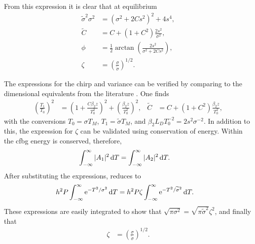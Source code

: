 From this expression it is clear that at equilibrium
\begin{subequations}
\begin{align}
\label{eq:varout}
\widetilde{\sigma}^2 \sigma^2 &= \left( \sigma^2 + 2 C s^2 \right)^2 + 4s^4, \\
\label{eq:chirpout}
\widetilde{C} &= C + (1+C^2) \frac{2 s^2}{\sigma^2}, \\
\label{eq:phase}
\phi &= \frac{1}{2} \arctan \left( \frac{2s^2}{\sigma^2 + 2C s^2} \right), \\
\zeta &= \left( \frac{\sigma}{\widetilde{\sigma}} \right)^{1/2}.
\end{align}
\end{subequations}

The expressions for the chirp and variance can be verified by comparing to the dimensional equivalents from the literature \cite{agrawal2013, anderson, ferreira, silfvast}. One finds
\begin{align*}
\left( \frac{T_1}{T_0} \right)^2 &= \left( 1 + \frac{C \beta_2 z}{T_0^2} \right)^2 + \left( \frac{ \beta_2 z}{T_0^2} \right)^2,&
\widetilde{C} &= C + (1+C^2) \frac{\beta_2 z}{T_0^2},
\end{align*}
with the conversions $T_0 = \sigma T_M$, $T_1 = \widetilde{\sigma} T_M$, and $\beta_2 L_D T_0^{-2} = 2s^2\sigma^{-2}$. In addition to this, the expression for $\zeta$ can be validated using conservation of energy. Within the \gls{cfbg} energy is conserved, therefore,
\begin{align*}
\int_{-\infty}^\infty |A_1|^2 \, \textrm{d} T &= \int_{-\infty}^\infty |A_2|^2 \, \textrm{d} T.
\end{align*}
After substituting the expressions, reduces to
\begin{align*}
h^2 P \int_{-\infty}^\infty \textrm{e}^{-T^2/\sigma^2} \, \textrm{d} T &= h^2 P \zeta \int_{-\infty}^\infty \textrm{e}^{-T^2/\widetilde{\sigma}^2} \, \textrm{d} T.
\end{align*}
These expressions are easily integrated to show that $\sqrt{\pi \sigma^2} = \sqrt{\pi \widetilde{\sigma}^2} \zeta^2$, and finally that
\begin{align*}
\zeta &= \left( \frac{\sigma}{\widetilde{\sigma}} \right)^{1/2}.
\end{align*}






